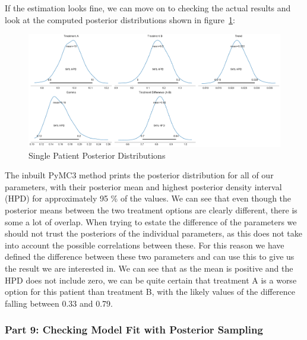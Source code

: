 \documentclass[12pt,a4paper,leqno]{report}
\theoremstyle{plain}
\theoremstyle{definition}
\theoremstyle{remark}
\begin{document}
If the estimation looks fine, we can move on to checking the actual results and look at
the computed posterior distributions shown in figure\ \ref{singlepatientposteriors}:

\bigskip
\begin{figure}[H]
    \caption{Single Patient Posterior Distributions}\label{singlepatientposteriors}
    \bigskip
    \includegraphics[width=\textwidth,height=\textheight,keepaspectratio]{single_patient_posteriors.pdf}
\end{figure}
\bigskip

The inbuilt PyMC3 method prints the posterior distribution for all of our parameters,
with their posterior mean and highest posterior density interval (HPD) for approximately
95 \% of the values. We can see that even though the posterior means between
the two treatment options are clearly different, there is some a lot of overlap. When
trying to estate the difference of the parameters we should not trust the posteriors of
the individual parameters, as this does not take into account the possible correlations
between these. For this reason we have defined the difference between these two
parameters and can use this to give us the result we are interested in. We can see
that as the mean is positive and the HPD does not include zero, we can be quite certain that
treatment A is a worse option for this patient than treatment B, with the likely values of
the difference falling between 0.33 and 0.79.


\subsubsection*{Part 9: Checking Model Fit with Posterior Sampling}
\end{document}

